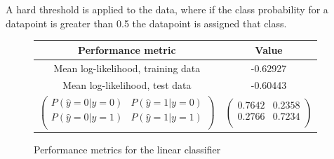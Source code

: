 \documentclass[a4paper]{article}
\begin{document}
    A hard threshold is applied to the data, where if the class probability for a datapoint is greater than 0.5 the
    datapoint is assigned that class.

    \begin{figure}[h]
        \label{tab:performance_metrics_linear}
        \centering
        \begin{tabular}{c|c}
            \textbf{Performance metric} & \textbf{Value} \\
            \hline
            Mean log-likelihood, training data & -0.62927 \\
            Mean log-likelihood, test data & -0.60443 \\
            $\begin{pmatrix}
                 P(\hat{y}=0 | y=0) & P(\hat{y}=1 | y=0) \\
                 P(\hat{y}=0 | y=1) & P(\hat{y}=1 | y=1) \\
            \end{pmatrix}$ &
            $\begin{pmatrix}
                0.7642 & 0.2358 \\
                0.2766 & 0.7234 \\
            \end{pmatrix}$ \\
        \end{tabular}
        \caption{Performance metrics for the linear classifier}
    \end{figure}
\end{document}
